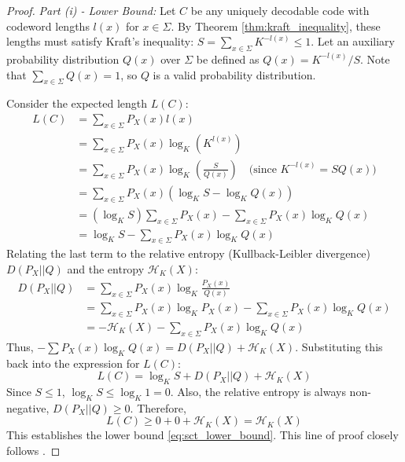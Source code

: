 \begin{proof}
    \emph{Part (i) - Lower Bound:}
    Let $C$ be any uniquely decodable code with codeword lengths $l(x)$ for $x \in \Sigma$. By Theorem \ref{thm:kraft_inequality}, these lengths must satisfy Kraft's inequality: $S = \sum_{x \in \Sigma} K^{-l(x)} \leq 1$.
    Let an auxiliary probability distribution $Q(x)$ over $\Sigma$ be defined as $Q(x) = K^{-l(x)} / S$. Note that $\sum_{x \in \Sigma} Q(x) = 1$, so $Q$ is a valid probability distribution.

    Consider the expected length $L(C)$:
    \begin{align*}
        L(C) & = \sum_{x \in \Sigma} P_X(x) l(x)                                                                                  \\
             & = \sum_{x \in \Sigma} P_X(x) \log_K \left( K^{l(x)} \right)                                                        \\
             & = \sum_{x \in \Sigma} P_X(x) \log_K \left( \frac{S}{Q(x)} \right) \quad \text{(since } K^{-l(x)} = S Q(x) \text{)} \\
             & = \sum_{x \in \Sigma} P_X(x) \left( \log_K S - \log_K Q(x) \right)                                                 \\
             & = (\log_K S) \sum_{x \in \Sigma} P_X(x) - \sum_{x \in \Sigma} P_X(x) \log_K Q(x)                                   \\
             & = \log_K S - \sum_{x \in \Sigma} P_X(x) \log_K Q(x)
    \end{align*}
    Relating the last term to the relative entropy (Kullback-Leibler divergence) $D(P_X || Q)$ and the entropy $\mathcal{H}_K(X)$:
    \begin{align*}
        D(P_X || Q) & = \sum_{x \in \Sigma} P_X(x) \log_K \frac{P_X(x)}{Q(x)}                             \\
                    & = \sum_{x \in \Sigma} P_X(x) \log_K P_X(x) - \sum_{x \in \Sigma} P_X(x) \log_K Q(x) \\
                    & = -\mathcal{H}_K(X) - \sum_{x \in \Sigma} P_X(x) \log_K Q(x)
    \end{align*}
    Thus, $-\sum P_X(x) \log_K Q(x) = D(P_X || Q) + \mathcal{H}_K(X)$.
    Substituting this back into the expression for $L(C)$:
    \begin{equation*}
        L(C) = \log_K S + D(P_X || Q) + \mathcal{H}_K(X)
    \end{equation*}
    Since $S \le 1$, $\log_K S \le \log_K 1 = 0$. Also, the relative entropy is always non-negative, $D(P_X || Q) \ge 0$. Therefore,
    \begin{equation*}
        L(C) \ge 0 + 0 + \mathcal{H}_K(X) = \mathcal{H}_K(X)
    \end{equation*}
    This establishes the lower bound \eqref{eq:sct_lower_bound}. This line of proof closely follows \cite{ElementsofInformationTheory}.


\end{proof}
